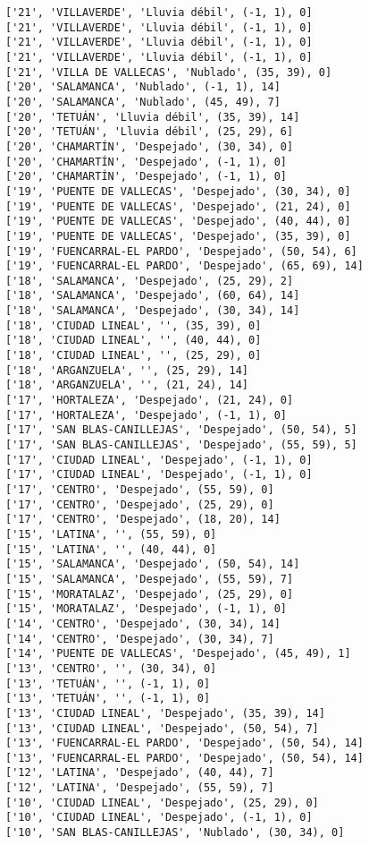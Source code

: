 \documentclass[11pt]{article}
\begin{document}
\begin{Verbatim}[commandchars=\\\{\}]
['21', 'VILLAVERDE', 'Lluvia débil', (-1, 1), 0]
['21', 'VILLAVERDE', 'Lluvia débil', (-1, 1), 0]
['21', 'VILLAVERDE', 'Lluvia débil', (-1, 1), 0]
['21', 'VILLAVERDE', 'Lluvia débil', (-1, 1), 0]
['21', 'VILLA DE VALLECAS', 'Nublado', (35, 39), 0]
['20', 'SALAMANCA', 'Nublado', (-1, 1), 14]
['20', 'SALAMANCA', 'Nublado', (45, 49), 7]
['20', 'TETUÁN', 'Lluvia débil', (35, 39), 14]
['20', 'TETUÁN', 'Lluvia débil', (25, 29), 6]
['20', 'CHAMARTÍN', 'Despejado', (30, 34), 0]
['20', 'CHAMARTÍN', 'Despejado', (-1, 1), 0]
['20', 'CHAMARTÍN', 'Despejado', (-1, 1), 0]
['19', 'PUENTE DE VALLECAS', 'Despejado', (30, 34), 0]
['19', 'PUENTE DE VALLECAS', 'Despejado', (21, 24), 0]
['19', 'PUENTE DE VALLECAS', 'Despejado', (40, 44), 0]
['19', 'PUENTE DE VALLECAS', 'Despejado', (35, 39), 0]
['19', 'FUENCARRAL-EL PARDO', 'Despejado', (50, 54), 6]
['19', 'FUENCARRAL-EL PARDO', 'Despejado', (65, 69), 14]
['18', 'SALAMANCA', 'Despejado', (25, 29), 2]
['18', 'SALAMANCA', 'Despejado', (60, 64), 14]
['18', 'SALAMANCA', 'Despejado', (30, 34), 14]
['18', 'CIUDAD LINEAL', '', (35, 39), 0]
['18', 'CIUDAD LINEAL', '', (40, 44), 0]
['18', 'CIUDAD LINEAL', '', (25, 29), 0]
['18', 'ARGANZUELA', '', (25, 29), 14]
['18', 'ARGANZUELA', '', (21, 24), 14]
['17', 'HORTALEZA', 'Despejado', (21, 24), 0]
['17', 'HORTALEZA', 'Despejado', (-1, 1), 0]
['17', 'SAN BLAS-CANILLEJAS', 'Despejado', (50, 54), 5]
['17', 'SAN BLAS-CANILLEJAS', 'Despejado', (55, 59), 5]
['17', 'CIUDAD LINEAL', 'Despejado', (-1, 1), 0]
['17', 'CIUDAD LINEAL', 'Despejado', (-1, 1), 0]
['17', 'CENTRO', 'Despejado', (55, 59), 0]
['17', 'CENTRO', 'Despejado', (25, 29), 0]
['17', 'CENTRO', 'Despejado', (18, 20), 14]
['15', 'LATINA', '', (55, 59), 0]
['15', 'LATINA', '', (40, 44), 0]
['15', 'SALAMANCA', 'Despejado', (50, 54), 14]
['15', 'SALAMANCA', 'Despejado', (55, 59), 7]
['15', 'MORATALAZ', 'Despejado', (25, 29), 0]
['15', 'MORATALAZ', 'Despejado', (-1, 1), 0]
['14', 'CENTRO', 'Despejado', (30, 34), 14]
['14', 'CENTRO', 'Despejado', (30, 34), 7]
['14', 'PUENTE DE VALLECAS', 'Despejado', (45, 49), 1]
['13', 'CENTRO', '', (30, 34), 0]
['13', 'TETUÁN', '', (-1, 1), 0]
['13', 'TETUÁN', '', (-1, 1), 0]
['13', 'CIUDAD LINEAL', 'Despejado', (35, 39), 14]
['13', 'CIUDAD LINEAL', 'Despejado', (50, 54), 7]
['13', 'FUENCARRAL-EL PARDO', 'Despejado', (50, 54), 14]
['13', 'FUENCARRAL-EL PARDO', 'Despejado', (50, 54), 14]
['12', 'LATINA', 'Despejado', (40, 44), 7]
['12', 'LATINA', 'Despejado', (55, 59), 7]
['10', 'CIUDAD LINEAL', 'Despejado', (25, 29), 0]
['10', 'CIUDAD LINEAL', 'Despejado', (-1, 1), 0]
['10', 'SAN BLAS-CANILLEJAS', 'Nublado', (30, 34), 0]

\end{Verbatim}
\end{document}
